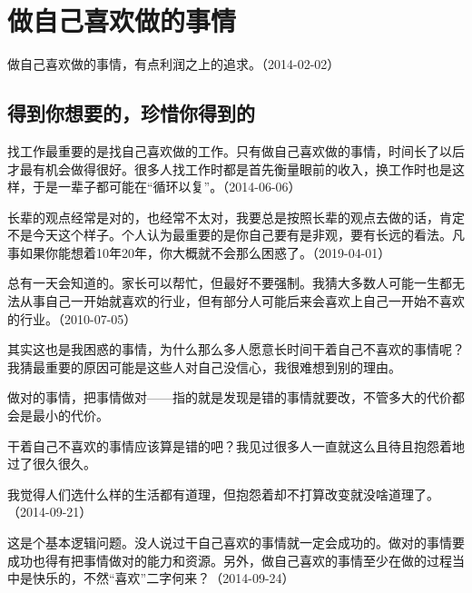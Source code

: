 
\section{做自己喜欢做的事情}


做自己喜欢做的事情，有点利润之上的追求。（2014-02-02）

\subsection{得到你想要的，珍惜你得到的}

找工作最重要的是找自己喜欢做的工作。只有做自己喜欢做的事情，时间长了以后才最有机会做得很好。很多人找工作时都是首先衡量眼前的收入，换工作时也是这样，于是一辈子都可能在“循环以复”。（2014-06-06）


长辈的观点经常是对的，也经常不太对，我要总是按照长辈的观点去做的话，肯定不是今天这个样子。个人认为最重要的是你自己要有是非观，要有长远的看法。凡事如果你能想着10年20年，你大概就不会那么困惑了。（2019-04-01）


总有一天会知道的。家长可以帮忙，但最好不要强制。我猜大多数人可能一生都无法从事自己一开始就喜欢的行业，但有部分人可能后来会喜欢上自己一开始不喜欢的行业。（2010-07-05）

其实这也是我困惑的事情，为什么那么多人愿意长时间干着自己不喜欢的事情呢？我猜最重要的原因可能是这些人对自己没信心，我很难想到别的理由。

做对的事情，把事情做对——指的就是发现是错的事情就要改，不管多大的代价都会是最小的代价。

干着自己不喜欢的事情应该算是错的吧？我见过很多人一直就这么且待且抱怨着地过了很久很久。

我觉得人们选什么样的生活都有道理，但抱怨着却不打算改变就没啥道理了。（2014-09-21）


这是个基本逻辑问题。没人说过干自己喜欢的事情就一定会成功的。做对的事情要成功也得有把事情做对的能力和资源。另外，做自己喜欢的事情至少在做的过程当中是快乐的，不然“喜欢”二字何来？（2014-09-24）

